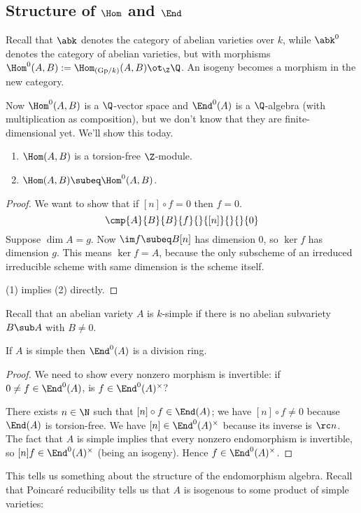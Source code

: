 
\subsection{Structure of $\Hom$ and $\End$}

Recall that $\abk$ denotes the category of abelian varieties over $k$, while $\abk^{0}$ denotes the category of abelian varieties, but with morphisms $\Hom^0(A,B):=\Hom_{(\text{Gp}/k)}(A,B)\ot_{\Z}\Q$. 
An isogeny becomes a morphism in the new category.

Now $\Hom^0(A,B)$ is a $\Q$-vector space and $\End^0(A)$ is a $\Q$-algebra (with multiplication as composition), but we don't know that they are finite-dimensional yet. We'll show this today. 
\begin{lem}
\begin{enumerate}
\item
$\Hom(A,B)$ is a torsion-free $\Z$-module.
\item
$\Hom(A,B)\subeq \Hom^0(A,B)$.
\end{enumerate}
\end{lem}
\begin{proof}
We want to show that if $[n]\circ f=0$ then $f=0$.
\[
\cmp{A}{B}{B}{f}{}{[n]}{}{}{0}
\]
Suppose $\dim A=g$. Now $\im f\subeq B[n]$ has dimension 0, so $\ker f$ has dimension $g$. This means $\ker f=A$, because the only subscheme of an irreduced irreducible scheme with same dimension is the scheme itself.

(1) implies (2) directly.
\end{proof}
Recall that an abelian variety $A$ is $k$-simple %
if there is no abelian subvariety $B\sub A$ with $B\ne 0$. 
\begin{lem}
If $A$ is simple then $\End^0(A)$ is a division ring. 
\end{lem}
\begin{proof}
We need to show every nonzero morphism is invertible: if $0\ne f\in \End^0(A)$, is $f\in \End^0(A)^{\times}$? 

There exists $n\in \N$ such that $[n]\circ f\in \End(A)$; we have $[n]\circ f\ne 0$ because $\End(A)$ is torsion-free. We have $[n]\in \End^0(A)^{\times}$ because its inverse is $\rc n$. The fact that $A$ is simple implies that every nonzero endomorphism is invertible, so $[n]f\in \End^0(A)^{\times}$ (being an isogeny). Hence $f\in \End^0(A)^{\times}$.
\end{proof}
This tells us something about the structure of the endomorphism algebra. Recall that Poincar\'e reducibility tells us that $A$ is isogenous to some product of simple varieties:

